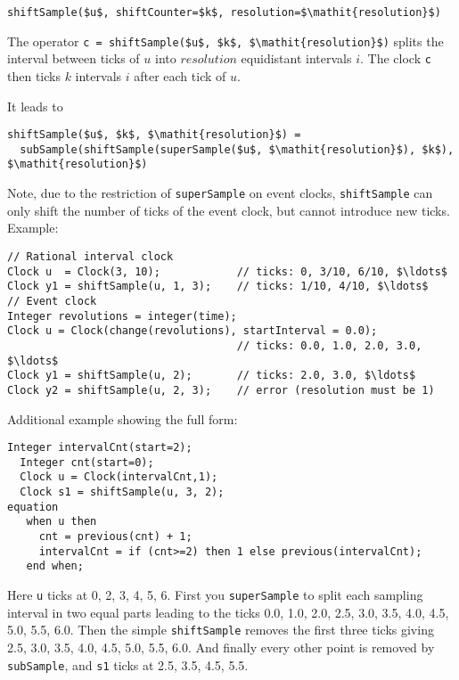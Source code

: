 \begin{operatordefinition}[shiftSample]
\begin{synopsis}\begin{lstlisting}
shiftSample($u$, shiftCounter=$k$, resolution=$\mathit{resolution}$)
\end{lstlisting}\end{synopsis}
\begin{semantics}
The operator \lstinline!c = shiftSample($u$, $k$, $\mathit{resolution}$)! splits the interval between ticks of $u$ into $\mathit{resolution}$ equidistant intervals $i$.
The clock \lstinline!c! then ticks $k$ intervals $i$ after each tick of $u$.

It leads to
\begin{lstlisting}[language=modelica]
shiftSample($u$, $k$, $\mathit{resolution}$) =
  subSample(shiftSample(superSample($u$, $\mathit{resolution}$), $k$), $\mathit{resolution}$)
\end{lstlisting}

\begin{nonnormative}
Note, due to the restriction of \lstinline!superSample! on event clocks, \lstinline!shiftSample! can only shift the number of ticks of the event clock, but cannot introduce new ticks.
Example:
\begin{lstlisting}[language=modelica]
// Rational interval clock
Clock u  = Clock(3, 10);            // ticks: 0, 3/10, 6/10, $\ldots$
Clock y1 = shiftSample(u, 1, 3);    // ticks: 1/10, 4/10, $\ldots$
// Event clock
Integer revolutions = integer(time);
Clock u = Clock(change(revolutions), startInterval = 0.0);
                                    // ticks: 0.0, 1.0, 2.0, 3.0, $\ldots$
Clock y1 = shiftSample(u, 2);       // ticks: 2.0, 3.0, $\ldots$
Clock y2 = shiftSample(u, 2, 3);    // error (resolution must be 1)
\end{lstlisting}
Additional example showing the full form:
\begin{lstlisting}[language=modelica]
  Integer intervalCnt(start=2);
  Integer cnt(start=0);
  Clock u = Clock(intervalCnt,1);
  Clock s1 = shiftSample(u, 3, 2);
equation
   when u then
     cnt = previous(cnt) + 1;
     intervalCnt = if (cnt>=2) then 1 else previous(intervalCnt);
   end when;
\end{lstlisting}
Here \lstinline!u! ticks at 0, 2, 3, 4, 5, 6.
First you \lstinline!superSample! to split each sampling interval in two equal parts leading to the ticks 0.0, 1.0, 2.0, 2.5, 3.0, 3.5, 4.0, 4.5, 5.0, 5.5, 6.0.
Then the simple \lstinline!shiftSample! removes the first three ticks giving 2.5, 3.0, 3.5, 4.0, 4.5, 5.0, 5.5, 6.0.
And finally every other point is removed by \lstinline!subSample!, and \lstinline!s1! ticks at 2.5, 3.5, 4.5, 5.5.
\end{nonnormative}
\end{semantics}
\end{operatordefinition}

